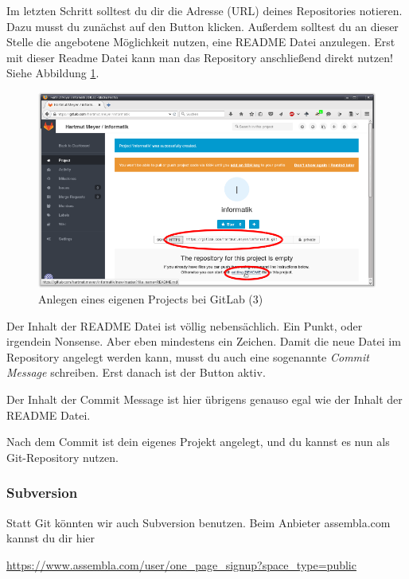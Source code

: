 Im letzten Schritt solltest du dir die Adresse (URL) deines Repositories
notieren. Dazu musst du zunächst auf den Button  klicken. Außerdem
solltest du an dieser Stelle die angebotene Möglichkeit nutzen, eine README
Datei anzulegen. Erst mit dieser Readme Datei kann man das Repository
anschließend direkt nutzen! Siehe Abbildung \ref{fig:gitlab-new-project-3}.

\begin{figure}[h]
  \centering
   \includegraphics[width=1.0\textwidth]{./inf/SEKII/01_Vorbereitung/GitLab_New_Project_3.png}
   \caption{Anlegen eines eigenen Projects bei GitLab (3)}
   \label{fig:gitlab-new-project-3}
\end{figure}

Der Inhalt der README Datei ist völlig nebensächlich. Ein Punkt, oder irgendein
Nonsense. Aber eben mindestens ein Zeichen. Damit die neue Datei im
Repository angelegt werden kann, musst du auch eine sogenannte \emph{Commit
Message} schreiben. Erst danach ist der Button  aktiv.

Der Inhalt der Commit Message ist hier übrigens genauso egal wie der Inhalt der
README Datei.

Nach dem Commit ist dein eigenes Projekt angelegt, und du kannst es nun als
Git-Repository nutzen.




\afterpage{\clearpage}

\subsubsection{Subversion}

Statt Git könnten wir auch Subversion benutzen. Beim Anbieter assembla.com
kannst du dir hier

\url{https://www.assembla.com/user/one_page_signup?space_type=public}

